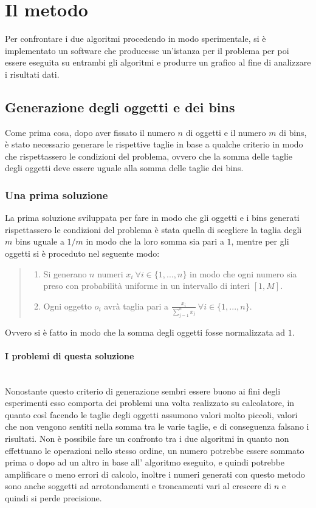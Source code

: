 \section{Il metodo}
Per confrontare i due algoritmi procedendo in modo sperimentale, si è implementato un software che producesse
un'istanza per il problema per poi essere eseguita su entrambi gli algoritmi e produrre un grafico al fine di 
analizzare i risultati dati. 

\subsection{Generazione degli oggetti e dei bins}
Come prima cosa, dopo aver fissato il numero $ n $ di oggetti e il numero $ m $ di bins, è stato necessario generare le rispettive taglie
in base a qualche criterio in modo che rispettassero le condizioni del problema, ovvero che la somma delle taglie degli oggetti 
deve essere uguale alla somma delle taglie dei bins.

\subsubsection{Una prima soluzione}
La prima soluzione sviluppata per fare in modo che gli oggetti e i bins generati rispettassero le condizioni del problema
è stata quella di scegliere la taglia degli $ m $ bins uguale a $ 1/m $ in modo che la loro somma sia pari a $ 1 $, mentre
per gli oggetti si è proceduto nel seguente modo:
\begin{quote}
	\begin{enumerate}
		\item Si generano $ n $ numeri $ x_i \: \forall i \in \{1, ..., n\} $ in modo che ogni numero sia preso con probabilità 
			  uniforme in un intervallo di interi $ [1, M] $.
		\item Ogni oggetto $ o_i $ avrà taglia pari a $ \displaystyle\frac{x_i}{\sum_{j=1}^n x_j} \: \forall i \in \{1, ..., n\} $.
	\end{enumerate}
\end{quote}
Ovvero si è fatto in modo che la somma degli oggetti fosse normalizzata ad $ 1 $.

\paragraph{I problemi di questa soluzione}\mbox{}\\
Nonostante questo criterio di generazione sembri essere buono ai fini degli esperimenti esso comporta dei problemi una volta
realizzato su calcolatore, in quanto così facendo le taglie degli oggetti assumono valori molto piccoli, valori che non vengono
sentiti nella somma tra le varie taglie, e di conseguenza falsano i risultati. Non è possibile fare un confronto tra i due algoritmi
in quanto non effettuano le operazioni nello stesso ordine, un numero potrebbe essere sommato prima o dopo ad un altro in base all'
algoritmo eseguito, e quindi potrebbe amplificare o meno errori di calcolo, inoltre i numeri generati con questo metodo sono
anche soggetti ad arrotondamenti e troncamenti vari al crescere di $ n $ e quindi si perde precisione.


